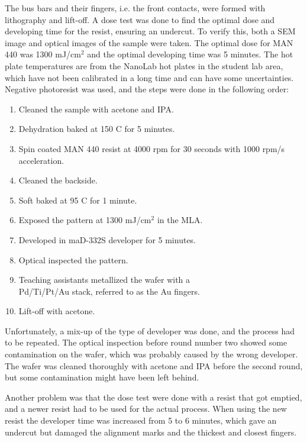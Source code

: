 \noindent The bus bars and their fingers, i.e. the front contacts, were formed with lithography and lift-off.
A dose test was done to find the optimal dose and developing time for the resist, ensuring an undercut.
To verify this, both a SEM image and optical images of the sample were taken.
The optimal dose for MAN 440 was 1300 mJ/cm$^2$ and the optimal developing time was 5 minutes.
The hot plate temperatures are from the NanoLab hot plates in the student lab area, which have not been calibrated in a long time and can have some uncertainties. 
Negative photoresist was used, and the steps were done in the following order:
\begin{enumerate}
    \item Cleaned the sample with acetone and IPA.
    \item Dehydration baked at 150 \textdegree C for 5 minutes.
    \item Spin coated MAN 440 resist at 4000 rpm for 30 seconds with 1000 rpm/s acceleration.
    \item Cleaned the backside.
    \item Soft baked at 95 \textdegree C for 1 minute.
    \item Exposed the pattern at 1300 mJ/cm$^2$ in the MLA.
    \item Developed in maD-332S developer for 5 minutes.
    \item Optical inspected the pattern.
    \item Teaching assistants metallized the wafer with a \\Pd/Ti/Pt/Au stack, referred to as the Au fingers.
    \item Lift-off with acetone.
\end{enumerate}


Unfortunately, a mix-up of the type of developer was done, and the process had to be repeated. 
The optical inspection before round number two showed some contamination on the wafer, which was probably caused by the wrong developer.
The wafer was cleaned thoroughly with acetone and IPA before the second round, but some contamination might have been left behind.

Another problem was that the dose test were done with a resist that got emptied, and a newer resist had to be used for the actual process.
When using the new resist the developer time was increased from 5 to 6 minutes, which gave an undercut but damaged the alignment marks and the thickest and closest fingers.

